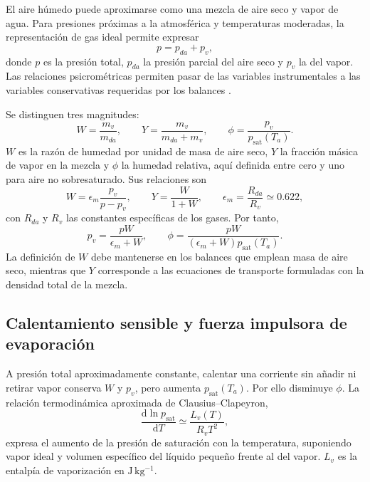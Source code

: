 El aire húmedo puede aproximarse como una mezcla de aire seco y vapor de agua. Para presiones próximas a la atmosférica y temperaturas moderadas, la representación de gas ideal permite expresar
\begin{equation}
p=p_{da}+p_v,
\label{eq:dalton}
\end{equation}
donde $p$ es la presión total, $p_{da}$ la presión parcial del aire seco y $p_v$ la del vapor. Las relaciones psicrométricas permiten pasar de las variables instrumentales a las variables conservativas requeridas por los balances \cite{ashrae2021}.

Se distinguen tres magnitudes:
\begin{equation}
W=\frac{m_v}{m_{da}},
\qquad
Y=\frac{m_v}{m_{da}+m_v},
\qquad
\phi=\frac{p_v}{p_{\mathrm{sat}}(T_a)}.
\label{eq:variables_humedad_aire}
\end{equation}
$W$ es la razón de humedad por unidad de masa de aire seco, $Y$ la fracción másica de vapor en la mezcla y $\phi$ la humedad relativa, aquí definida entre cero y uno para aire no sobresaturado. Sus relaciones son
\begin{equation}
W=\epsilon_m\frac{p_v}{p-p_v},
\qquad
Y=\frac{W}{1+W},
\qquad
\epsilon_m=\frac{R_{da}}{R_v}\simeq 0.622,
\label{eq:razon_humedad}
\end{equation}
con $R_{da}$ y $R_v$ las constantes específicas de los gases. Por tanto,
\begin{equation}
p_v=\frac{pW}{\epsilon_m+W},
\qquad
\phi=\frac{pW}{(\epsilon_m+W)p_{\mathrm{sat}}(T_a)}.
\label{eq:conversion_psicrometrica}
\end{equation}
La definición de $W$ debe mantenerse en los balances que emplean masa de aire seco, mientras que $Y$ corresponde a las ecuaciones de transporte formuladas con la densidad total de la mezcla.

\subsection{Calentamiento sensible y fuerza impulsora de evaporación}

A presión total aproximadamente constante, calentar una corriente sin añadir ni retirar vapor conserva $W$ y $p_v$, pero aumenta $p_{\mathrm{sat}}(T_a)$. Por ello disminuye $\phi$. La relación termodinámica aproximada de Clausius--Clapeyron,
\begin{equation}
\frac{\mathrm{d}\ln p_{\mathrm{sat}}}{\mathrm{d}T}
\simeq\frac{L_v(T)}{R_vT^2},
\label{eq:clausius_clapeyron}
\end{equation}
expresa el aumento de la presión de saturación con la temperatura, suponiendo vapor ideal y volumen específico del líquido pequeño frente al del vapor. $L_v$ es la entalpía de vaporización en $\mathrm{J\,kg^{-1}}$.

